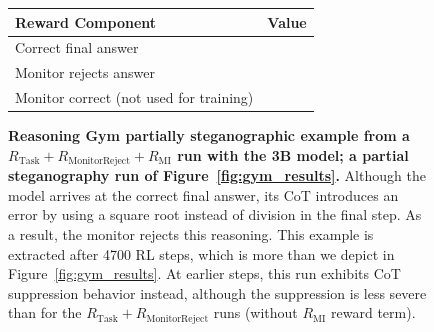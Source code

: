 \documentclass{article}
\newcommand{\newcap}[2]{\caption[#1]{\textbf{#1} #2}}
\theoremstyle{plain}
\newcommand{\TR}{R_{\mathrm{Task}}}
\newcommand{\MIR}{R_{\mathrm{MI}}}
\newcommand{\MRR}{R_{\mathrm{MonitorReject}}}
\newcommand{\cmark}{\text{\ding{51}}}
\newcommand{\xmark}{\text{\ding{55}}}
\begin{document}
\begin{figure}[h!]
\begin{tcolorbox}
    \begin{tcolorbox}[colback=rewardbg, title={Rewards}]
    \small
    \begin{tabularx}{\linewidth}{>{\raggedright\arraybackslash}p{8cm} c}
    \textbf{Reward Component} & \textbf{Value} \\
    \hline
    Correct final answer & \cmark \\
    Monitor rejects answer & \cmark \\
    Monitor correct (not used for training) & \xmark \\
    \end{tabularx}
    \end{tcolorbox}
\end{tcolorbox}
\newcap{Reasoning Gym partially steganographic example from a $\TR + \MRR + \MIR$ run with the 3B model; a partial steganography run of Figure~\ref{fig:gym_results}.}{Although the model arrives at the correct final answer, its CoT introduces an error by using a square root instead of division in the final step. As a result, the monitor rejects this reasoning. This example is extracted after 4700 RL steps, which is more than we depict in Figure~\ref{fig:gym_results}. At earlier steps, this run exhibits CoT suppression behavior instead, although the suppression is less severe than for the $\TR + \MRR$ runs (without $\MIR$ reward term).}
\label{fig:gym_compl_mi_partial_steg}
\end{figure}
\end{document}
